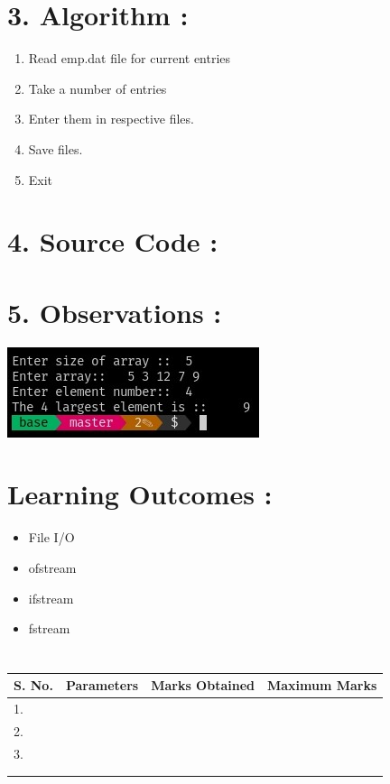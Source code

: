 \documentclass[14pt]{extarticle}
\begin{document}

\section*{\normalsize 3. Algorithm :}

\begin{enumerate}
  \item Read emp.dat file for current entries
  \item Take a number of entries
  \item Enter them in respective files.
  \item Save files.
  \item Exit
\end{enumerate}


\newpage
\section*{\normalsize 4. Source Code :}

 

\newpage
\section*{\normalsize 5. Observations :}

\begin{center}
\includegraphics[scale=1.15]{temp/output.jpeg}
\end{center}

\section*{\normalsize Learning Outcomes :}
  
  \begin{itemize}
    \item File I/O
    \item ofstream
    \item ifstream
    \item fstream
  \end{itemize}

\section*{}

\begin{center}

\begin{tabular}{ |p{2.5cm}|p{4cm}|p{5cm}|p{5cm}|} 
 \hline
 S. No. & Parameters & Marks Obtained & Maximum Marks \\
 \hline
 1.&&&\\
 \hline
 2.&&&\\
 \hline
 3.&&&\\
 \hline
 &&&\\
 &&&\\
 \hline
\end{tabular}
\end{center}
\end{document}
